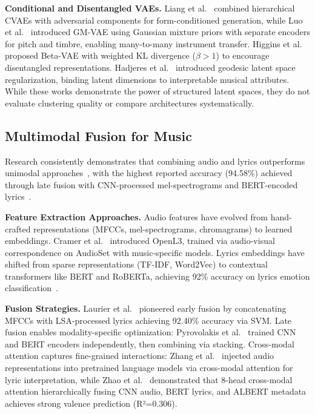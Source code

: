 \documentclass[10pt,twocolumn]{article}
\begin{document}
\textbf{Conditional and Disentangled VAEs.} Liang et al.~\cite{liang2019midisandwich} combined hierarchical CVAEs with adversarial components for form-conditioned generation, while Luo et al.~\cite{luo2019gmvae} introduced GM-VAE using Gaussian mixture priors with separate encoders for pitch and timbre, enabling many-to-many instrument transfer. Higgins et al.~\cite{higgins2017beta} proposed Beta-VAE with weighted KL divergence ($\beta > 1$) to encourage disentangled representations. Hadjeres et al.~\cite{hadjeres2017glsr} introduced geodesic latent space regularization, binding latent dimensions to interpretable musical attributes. While these works demonstrate the power of structured latent spaces, they do not evaluate clustering quality or compare architectures systematically.

\subsection{Multimodal Fusion for Music}

Research consistently demonstrates that combining audio and lyrics outperforms unimodal approaches~\cite{liu2020multimodal,pyrovolakis2022emotion}, with the highest reported accuracy (94.58\%) achieved through late fusion with CNN-processed mel-spectrograms and BERT-encoded lyrics~\cite{pyrovolakis2022emotion}.

\textbf{Feature Extraction Approaches.} Audio features have evolved from hand-crafted representations (MFCCs, mel-spectrograms, chromagrams) to learned embeddings. Cramer et al.~\cite{cramer2019openl3} introduced OpenL3, trained via audio-visual correspondence on AudioSet with music-specific models. Lyrics embeddings have shifted from sparse representations (TF-IDF, Word2Vec) to contextual transformers like BERT and RoBERTa, achieving 92\% accuracy on lyrics emotion classification~\cite{pyrovolakis2022lyemobert}.

\textbf{Fusion Strategies.} Laurier et al.~\cite{laurier2008multimodal} pioneered early fusion by concatenating MFCCs with LSA-processed lyrics achieving 92.40\% accuracy via SVM. Late fusion enables modality-specific optimization: Pyrovolakis et al.~\cite{pyrovolakis2022emotion} trained CNN and BERT encoders independently, then combining via stacking. Cross-modal attention captures fine-grained interactions: Zhang et al.~\cite{zhang2022bart} injected audio representations into pretrained language models via cross-modal attention for lyric interpretation, while Zhao et al.~\cite{zhao2022multimodal} demonstrated that 8-head cross-modal attention hierarchically fusing CNN audio, BERT lyrics, and ALBERT metadata achieves strong valence prediction (R²=0.306).
\end{document}
